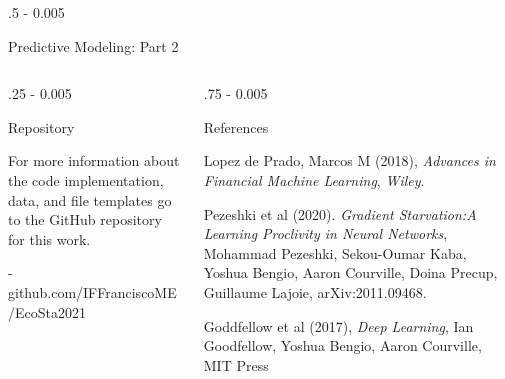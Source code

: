 \documentclass{postertheme}\usepackage[]{graphicx}\usepackage[]{color}
\begin{document}
\begin{frame}
\begin{columns}[onlytextwidth]
\begin{column}{.5 \textwidth - 0.005 \textwidth}
\begin{block}{Predictive Modeling: Part 2}
    \end{block}
  \end{column}
  
\end{columns}


\begin{columns}[onlytextwidth]
  
  \begin{column}{.25 \textwidth - 0.005 \textwidth}
    \begin{block}{Repository}
        
        For more information about the code implementation, data, and file templates go to the GitHub
        repository for this work.
        
        - github.com/IFFranciscoME/EcoSta2021
        
    \end{block}
  \end{column}
  
  \begin{column}{.75 \textwidth - 0.005 \textwidth}
    \begin{block}{References}
    
    \begin{thebibliography}{02}
              Lopez de Prado, Marcos M (2018), \textit{Advances in Financial Machine Learning}, \emph{Wiley}.

               Pezeshki et al (2020). \textit{Gradient Starvation:A Learning Proclivity in Neural Networks},
               Mohammad Pezeshki, Sekou-Oumar Kaba, Yoshua Bengio, Aaron Courville, Doina Precup,
               Guillaume Lajoie, arXiv:2011.09468.
                                                     
               Goddfellow et al (2017), \textit{Deep Learning}, Ian Goodfellow, Yoshua Bengio,
               Aaron Courville, MIT Press
    \end{thebibliography}
    
    \end{block}
  \end{column}
\end{columns}


\end{frame}
\end{document}
